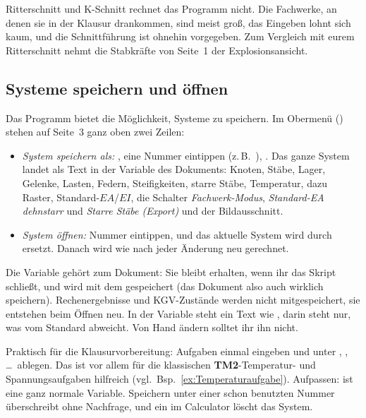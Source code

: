 Ritterschnitt und K-Schnitt rechnet das Programm nicht. Die Fachwerke, an denen sie in der Klausur
drankommen, sind meist groß, das Eingeben lohnt sich kaum, und die Schnittführung ist ohnehin
vorgegeben. Zum Vergleich mit eurem Ritterschnitt nehmt die Stabkräfte von Seite~1 der
Explosionsansicht.

\subsection{Systeme speichern und öffnen}\label{sec:system-speichern}

Das Programm bietet die Möglichkeit, Systeme zu speichern. Im Obermenü ()
stehen auf Seite~3 ganz oben zwei Zeilen:

\begin{itemize}
  \item \emph{System speichern als:} , eine Nummer eintippen (z.\,B.\ ),
        . Das ganze System landet als Text in der Variable  des
        Dokuments: Knoten, Stäbe, Lager, Gelenke, Lasten, Federn, Steifigkeiten, starre Stäbe,
        Temperatur, dazu Raster, Standard-$EA$/$EI$, die Schalter \emph{Fachwerk-Modus},
        \emph{Standard-EA dehnstarr} und \emph{Starre Stäbe (Export)} und der Bildausschnitt.
  \item \emph{System öffnen:} Nummer eintippen, und das aktuelle System wird durch 
        ersetzt. Danach wird wie nach jeder Änderung neu gerechnet.
\end{itemize}

Die Variable gehört zum Dokument: Sie bleibt erhalten, wenn ihr das Skript schließt, und wird mit
dem  gespeichert (das Dokument also auch wirklich speichern). Rechenergebnisse und
KGV-Zustände werden nicht mitgespeichert, sie entstehen beim Öffnen neu. In der Variable steht ein
Text wie , darin steht nur, was vom
Standard abweicht. Von Hand ändern solltet ihr ihn nicht.

Praktisch für die Klausurvorbereitung: Aufgaben einmal eingeben und unter ,
, \dots\ ablegen. Das ist vor allem für die klassischen \textbf{TM2}-Temperatur- und Spannungsaufgaben hilfreich (vgl.\ Bsp.~\ref{ex:Temperaturaufgabe}).
Aufpassen:  ist eine ganz normale Variable. Speichern
unter einer schon benutzten Nummer überschreibt ohne Nachfrage, und ein  im
Calculator löscht das System.

